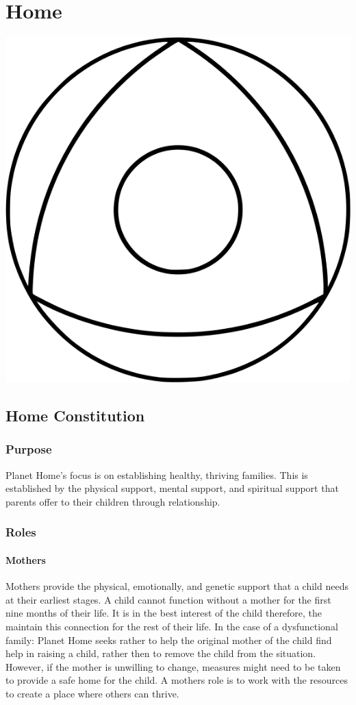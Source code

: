 \documentclass[CSHFoundation.tex]{subfiles}
\begin{document}
\chapter{Home}
\centerline{\includegraphics[scale=0.35]{6-Hlogo.png}}
\section{Home Constitution}

\subsection{Purpose}

Planet Home’s focus is on establishing healthy, thriving families. This is established by the physical support, mental support, and spiritual support that parents offer to their children through relationship.


\subsection{Roles}

\subsubsection{Mothers}

Mothers provide the physical, emotionally, and genetic support that a child needs at their earliest stages. A child cannot function without a mother for the first nine months of their life. It is in the best interest of the child therefore, the maintain this connection for the rest of their life. In the case of a dysfunctional family: Planet Home seeks rather to help the original mother of the child find help in raising a child, rather then to remove the child from the situation. However, if the mother is unwilling to change, measures might need to be taken to provide a safe home for the child. A mothers role is to work with the resources to create a place where others can thrive.
\end{document}
